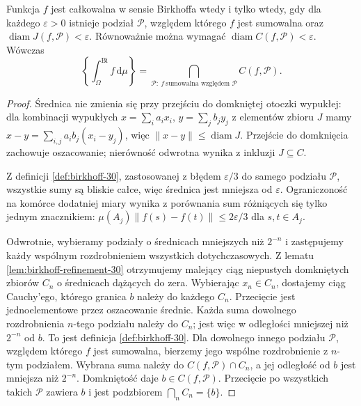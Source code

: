 \begin{twierdzenie}
\label{thm:birkhoff-convex-30}
Funkcja $f$ jest całkowalna w sensie Birkhoffa
wtedy i tylko wtedy, gdy dla każdego $\varepsilon>0$
istnieje podział $\mathcal P$, względem którego
$f$ jest sumowalna oraz
$\operatorname{diam}J(f,\mathcal P)<\varepsilon$.
Równoważnie można wymagać
$\operatorname{diam}C(f,\mathcal P)<\varepsilon$.
Wówczas
\[
 \left\{\int_\Omega^{\mathrm{Bi}}f\,\mathrm d\mu\right\}
 =
 \bigcap_{\mathcal P:\ f\ \text{sumowalna względem }\mathcal P}
 C(f,\mathcal P).
\]
\end{twierdzenie}
\begin{proof}
Średnica nie zmienia się przy przejściu do domkniętej
otoczki wypukłej: dla kombinacji wypukłych
$x=\sum_i a_ix_i$, $y=\sum_j b_jy_j$ z elementów
zbioru $J$ mamy
$x-y=\sum_{i,j}a_ib_j(x_i-y_j)$, więc
$\|x-y\|\le\operatorname{diam}J$.
Przejście do domknięcia zachowuje oszacowanie;
nierówność odwrotna wynika z inkluzji $J\subseteq C$.

Z definicji \ref{def:birkhoff-30}, zastosowanej
z błędem $\varepsilon/3$ do samego podziału
$\mathcal P$, wszystkie sumy są bliskie całce,
więc średnica jest mniejsza od $\varepsilon$.
Ograniczoność na komórce dodatniej miary wynika
z porównania sum różniących się tylko jednym
znacznikiem: $\mu(A_j)\|f(s)-f(t)\|
\le 2\varepsilon/3$ dla $s,t\in A_j$.

Odwrotnie, wybieramy podziały o średnicach
mniejszych niż $2^{-n}$ i zastępujemy każdy
wspólnym rozdrobnieniem wszystkich dotychczasowych.
Z lematu \ref{lem:birkhoff-refinement-30} otrzymujemy
malejący ciąg niepustych domkniętych zbiorów
$C_n$ o średnicach dążących do zera.
Wybierając $x_n\in C_n$, dostajemy ciąg Cauchy'ego,
którego granica $b$ należy do każdego $C_n$.
Przecięcie jest jednoelementowe przez oszacowanie
średnic. Każda suma dowolnego rozdrobnienia
$n$-tego podziału należy do $C_n$; jest więc
w odległości mniejszej niż $2^{-n}$ od $b$.
To jest definicja \ref{def:birkhoff-30}.
Dla dowolnego innego podziału $\mathcal P$,
względem którego $f$ jest sumowalna, bierzemy
jego wspólne rozdrobnienie z $n$-tym podziałem.
Wybrana suma należy do $C(f,\mathcal P)\cap C_n$,
a jej odległość od $b$ jest mniejsza niż $2^{-n}$.
Domkniętość daje $b\in C(f,\mathcal P)$.
Przecięcie po wszystkich takich $\mathcal P$
zawiera $b$ i jest podzbiorem $\bigcap_n C_n=\{b\}$.
\end{proof}

